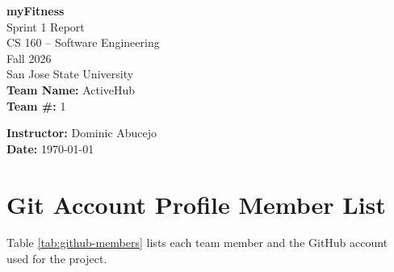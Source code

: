 \documentclass[11pt]{article}
\begin{document}

\begin{titlepage}
    \centering

    \vspace*{1.5in}

    {\Huge \textbf{myFitness}}\\[0.5cm]
    {\Large Sprint 1 Report}\\[1.5cm]

    {\large CS 160 -- Software Engineering}\\
    {\large Fall 2026}\\
    {\large San Jose State University}\\[1.5cm]

    \textbf{Team Name:} ActiveHub\\
    \textbf{Team \#:} 1\\[1.5cm]

    \vfill

    \textbf{Instructor:} Dominic Abucejo\\
    \textbf{Date:} \today

\end{titlepage}


\tableofcontents
\newpage


\section{Git Account Profile Member List}

Table \ref{tab:github-members} lists each team member and the GitHub
account used for the project.
\end{document}
